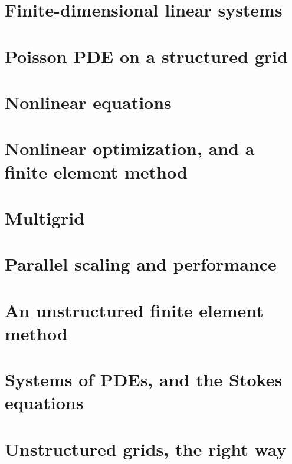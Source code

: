 \documentclass{tufte-book}
\newcommand{\CODELOC}{}  %
\newcommand{\stubinput}[2]{}
\newcommand{\stubinput}[2]{\vspace{5cm} \centerline{\LARGE Percent completed:  \Huge #2\%.} \vfill}
\theoremstyle{definition}
\begin{document}
\chapter{Finite-dimensional linear systems}
\label{chap:ls}
\renewcommand{\CODELOC}{ch2/}


\chapter{Poisson PDE on a structured grid}
\label{chap:st}
\renewcommand{\CODELOC}{ch3/}


\chapter{Nonlinear equations}
\label{chap:nl}
\renewcommand{\CODELOC}{ch4/}


\chapter{Nonlinear optimization, and a finite element method}
\label{chap:of}
\renewcommand{\CODELOC}{ch5/}
\stubinput{optifem.tex}{10}

\chapter{Multigrid}
\label{chap:mg}
\renewcommand{\CODELOC}{ch6/}
\stubinput{multigrid.tex}{20}

\chapter{Parallel scaling and performance}
\label{chap:sc}
\renewcommand{\CODELOC}{ch7/}
\stubinput{scaling.tex}{5}

\chapter{An unstructured finite element method}
\label{chap:un}
\renewcommand{\CODELOC}{ch8/}
\stubinput{unstructured.tex}{40}

\chapter{Systems of PDEs, and the Stokes equations}
\label{chap:sy}
\renewcommand{\CODELOC}{ch9/}
\stubinput{stokes.tex}{5}

\chapter{Unstructured grids, the right way}
\label{chap:dp}
\renewcommand{\CODELOC}{ch10/}
\stubinput{dmplex.tex}{0}
\end{document}
